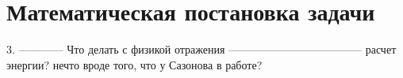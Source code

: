 \section*{Математическая постановка задачи}



3. ------------ Что делать с физикой отражения ------------------------------------
расчет энергии? нечто вроде того, что у Сазонова в работе?



